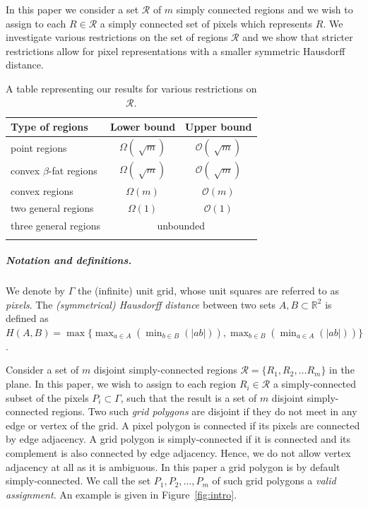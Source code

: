 \documentclass[a4paper,UKenglish,cleveref]{lipics-v2019}
\newcommand{\mremark}[3]{\textcolor{blue}{\textsc{#1 #2:}} \textcolor{SeaGreen}{\textsf{#3}}}
\newcommand{\jordi}[2][says]{\mremark{Jordi}{#1}{#2}}
\newcommand{\bigo}{\ensuremath{\mathcal O}}
\newcommand{\R}{\mathbb{R}}
\begin{document}
In this paper we consider a set $\mathcal{R}$ of $m$ simply connected regions and we wish to assign to each $R \in \mathcal{R}$ a simply connected set of pixels which represents $R$.
We investigate various restrictions on the set of regions $\mathcal{R}$ and we show that stricter restrictions allow for pixel representations with a smaller symmetric Hausdorff distance.



\begin{table}[H]
\begin{tabular}{lcc}
\toprule
Type of regions & Lower bound & Upper bound  \\ \midrule
point regions & $\Omega(\sqrt[]{m}) $ & $\bigo(\sqrt[]{m})$ \\
convex $\beta$-fat regions & $\Omega(\sqrt[]{m}) $ & $\bigo(\sqrt[]{m})$ \\
convex regions & $\Omega(m) $ & $\bigo(m)$ \\
two general regions &  $\Omega(1)$ & $\bigo(1)$\\
three general regions &  \multicolumn{2}{c}{unbounded}\\
\bottomrule\\
\end{tabular}
\caption{A table representing our results for various restrictions on $\mathcal{R}$.}
\label{table:results}
\end{table}

\subparagraph{Notation and definitions.}
We denote by $\Gamma$ the (infinite) unit grid, whose unit squares are referred to as \emph{pixels}. 
The {\em (symmetrical) Hausdorff distance} between two sets $A, B \subset \R^2$ is defined as $H(A, B) = \max \{\max_{a \in A}(\min_{b \in B}(|ab|)), \max_{b \in B}(\min_{a \in A}(|ab|))\}$. 
  
Consider a set of $m$ disjoint simply-connected regions $\mathcal{R} = \{R_1, R_2, \ldots R_m \}$ in the plane.
In this paper, we wish to assign to each region $R_i \in \mathcal{R}$ a simply-connected subset of the pixels $P_i \subset \Gamma$, such that the result is a set of $m$ disjoint simply-connected regions.
Two such \emph{grid polygons} are disjoint if they do not meet in any edge or vertex of the grid. A pixel polygon is connected if its pixels are connected by edge adjacency. A grid polygon is simply-connected if it is connected and its complement is also connected by edge adjacency. 
Hence, we do not allow vertex adjacency at all as it is ambiguous. In this paper a grid polygon is by default simply-connected.
We call the set $P_1, P_2, \ldots, P_m$ of such grid polygons a \emph{valid assignment}. An example is given in Figure~\ref{fig:intro}.
\end{document}
